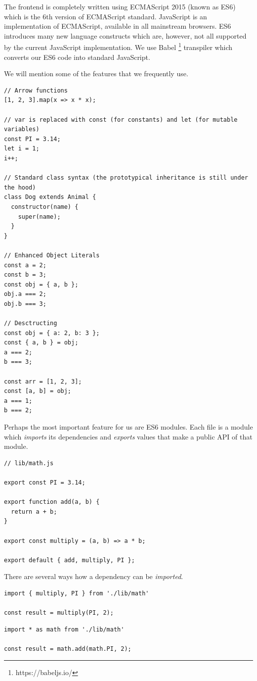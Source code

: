 The frontend is completely written using ECMAScript 2015 \cite{es6} (known as ES6) which is the 6th version of ECMAScript standard. JavaScript is an implementation of ECMAScript, available in all mainstream browsers. ES6 introduces many new language constructs which are, however, not all supported by the current JavaScript implementation. We use Babel \footnote{https://babeljs.io/} transpiler which converts our ES6 code into standard JavaScript.

We will mention some of the features that we frequently use.

\begin{verbatim}
// Arrow functions
[1, 2, 3].map(x => x * x);

// var is replaced with const (for constants) and let (for mutable variables)
const PI = 3.14;
let i = 1;
i++;

// Standard class syntax (the prototypical inheritance is still under the hood)
class Dog extends Animal {
  constructor(name) {
    super(name);
  }
}

// Enhanced Object Literals
const a = 2;
const b = 3;
const obj = { a, b };
obj.a === 2;
obj.b === 3;

// Desctructing
const obj = { a: 2, b: 3 };
const { a, b } = obj;
a === 2;
b === 3;

const arr = [1, 2, 3];
const [a, b] = obj;
a === 1;
b === 2;
\end{verbatim}

Perhaps the most important feature for us are ES6 modules. Each file is a module which \emph{imports} its dependencies and \emph{exports} values that make a public API of that module.

\begin{verbatim}
// lib/math.js

export const PI = 3.14;

export function add(a, b) {
  return a + b;
}

export const multiply = (a, b) => a * b;

export default { add, multiply, PI };
\end{verbatim}

There are several ways how a dependency can be \emph{imported}.

\begin{verbatim}
import { multiply, PI } from './lib/math'

const result = multiply(PI, 2);
\end{verbatim}

\begin{verbatim}
import * as math from './lib/math'

const result = math.add(math.PI, 2);
\end{verbatim}

